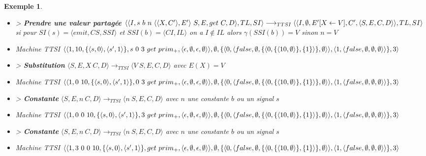 \documentclass[10pt,a4paper]{report}
\newtheorem{ex}{Exemple}
\begin{document}
\begin{ex}
\begin{itemize}
			\item[] > \textbf{Prendre une valeur partagée} $\langle\langle I,s~b~n~\langle\langle X,C'\rangle,E'\rangle~S,E,get~C,D\rangle,TL,SI\rangle 
			\longrightarrow_{TTSI} 
			\\\langle\langle I,\emptyset,E'[X \leftarrow V],C',\langle S,E,C,D\rangle\rangle,TL,SI\rangle$
			\\ si pour $SI(s) = \langle emit,CS,SSI\rangle$ et $SSI(b) = \langle CI,IL\rangle$ on a $I \notin IL$ alors $\gamma(SSI(b)) = V$ sinon $n = V$
			\item[] Machine TTSI $\langle\langle 1,10,\{\langle s,0\rangle,\langle s',1\rangle\},s~0~3~get~prim_{+} ,\langle\epsilon,\emptyset,\epsilon,\emptyset\rangle\rangle,\emptyset,\{\langle 0,\langle false,\emptyset,\{\langle 0,\{\langle 10,\emptyset\rangle\},\{1\}\rangle\},\emptyset\rangle\rangle,\\\langle 1,\langle false,\emptyset,\emptyset,\emptyset\rangle\rangle\},3\rangle$ 
			\item[] > \textbf{Substitution} $\langle S,E,X~C,D\rangle
			\longrightarrow_{TTSI} 
			\langle V~S,E,C,D\rangle$ avec $E(X) = V$
			\item[] Machine TTSI $\langle\langle 1,0~10,\{\langle s,0\rangle,\langle s',1\rangle\},0~3~get~prim_{+} ,\langle\epsilon,\emptyset,\epsilon,\emptyset\rangle\rangle,\emptyset,\{\langle 0,\langle false,\emptyset,\{\langle 0,\{\langle 10,\emptyset\rangle\},\{1\}\rangle\},\emptyset\rangle\rangle,\\\langle 1,\langle false,\emptyset,\emptyset,\emptyset\rangle\rangle\},3\rangle$ 
			\item[] > \textbf{Constante} $\langle S,E,n~C,D\rangle 
			\longrightarrow_{TTSI} 
			\langle n~S,E,C,D\rangle$ avec $n$ une constante $b$ ou un signal $s$
			\item[] Machine TTSI $\langle\langle 1,0~0~10,\{\langle s,0\rangle,\langle s',1\rangle\},3~get~prim_{+} ,\langle\epsilon,\emptyset,\epsilon,\emptyset\rangle\rangle,\emptyset,\{\langle 0,\langle false,\emptyset,\{\langle 0,\{\langle 10,\emptyset\rangle\},\{1\}\rangle\},\emptyset\rangle\rangle,\\\langle 1,\langle false,\emptyset,\emptyset,\emptyset\rangle\rangle\},3\rangle$ 
			\item[] > \textbf{Constante} $\langle S,E,n~C,D\rangle 
			\longrightarrow_{TTSI} 
			\langle n~S,E,C,D\rangle$ avec $n$ une constante $b$ ou un signal $s$
			\item[] Machine TTSI $\langle\langle 1,3~0~0~10,\{\langle s,0\rangle,\langle s',1\rangle\},get~prim_{+} ,\langle\epsilon,\emptyset,\epsilon,\emptyset\rangle\rangle,\emptyset,\{\langle 0,\langle false,\emptyset,\{\langle 0,\{\langle 10,\emptyset\rangle\},\{1\}\rangle\},\emptyset\rangle\rangle,\\\langle 1,\langle false,\emptyset,\emptyset,\emptyset\rangle\rangle\},3\rangle$ 

\end{itemize}
\end{ex}
\end{document}
